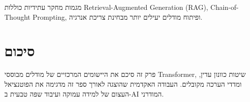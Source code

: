 מגמות מחקר עתידיות כוללות \textenglish{Retrieval-Augmented Generation}
(\textenglish{RAG}), \textenglish{Chain-of-Thought Prompting}, ופיתוח
מודלים יעילים יותר מבחינת צריכת אנרגיה.

\section{סיכום}

פרק זה סיכם את היישומים המרכזיים של מודלים מבוססי \textenglish{Transformer},
שיטות כוונון עדין, ומדדי הערכה מקובלים. העבודה האקדמית שהוצגה לאורך ספר זה
מדגימה את הפוטנציאל העצום של למידה עמוקה ועיבוד שפה טבעית ב-\textenglish{AI}
המודרני.
